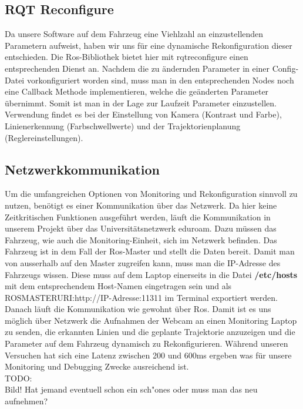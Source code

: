 \subsection{RQT Reconfigure}
Da unsere Software auf dem Fahrzeug eine Viehlzahl an einzustellenden Parametern aufweist, haben wir uns f\"ur eine dynamische Rekonfiguration dieser entschieden. Die Ros-Bibliothek bietet hier mit rqt\textunderscore reconfigure einen entsprechenden Dienst an. Nachdem die zu \"andernden Parameter in einer Config-Datei vorkonfiguriert worden sind, muss man in den entsprechenden Nodes noch eine Callback Methode implementieren, welche die ge\"anderten Parameter \"ubernimmt. Somit ist man in der Lage zur Laufzeit Parameter einzustellen. Verwendung findet es bei der Einstellung von Kamera (Kontrast und Farbe), Linienerkennung (Farbschwellwerte) und der Trajektorienplanung (Reglereinstellungen).

\subsection{Netzwerkkommunikation}
Um die umfangreichen Optionen von Monitoring und Rekonfiguration sinnvoll zu nutzen, ben\"otigt es einer Kommunikation \"uber das Netzwerk. Da hier keine Zeitkritischen Funktionen ausgef\"uhrt werden, l\"auft die Kommunikation in unserem Projekt \"uber das Universit\"atsnetzwerk eduroam. Dazu m\"ussen das Fahrzeug, wie auch die Monitoring-Einheit, sich im Netzwerk befinden. Das Fahrzeug ist in dem Fall der Ros-Master und stellt die Daten bereit. Damit man von ausserhalb auf den Master zugreifen kann, muss man die IP-Adresse des Fahrzeugs wissen. Diese muss auf dem Laptop einerseits in die Datei \textbf{/etc/hosts} mit dem entsprechendem Host-Namen eingetragen sein und als ROS\textunderscore MASTER\textunderscore URI:http://IP-Adresse:11311 im Terminal exportiert werden. Danach l\"auft die Kommunikation wie gewohnt \"uber Ros. Damit ist es uns m\"oglich \"uber Netzwerk die Aufnahmen der Webcam an einen Monitoring Laptop zu senden, die erkannten Linien und die geplante Trajektorie anzuzeigen und die Parameter auf dem Fahrzeug dynamisch zu Rekonfigurieren. W\"ahrend unseren Versuchen hat sich eine Latenz zwischen 200 und 600ms ergeben was f\"ur unsere Monitoring und Debugging Zwecke ausreichend ist. \\

TODO:\\
Bild! Hat jemand eventuell schon ein sch"ones oder muss man das neu aufnehmen?